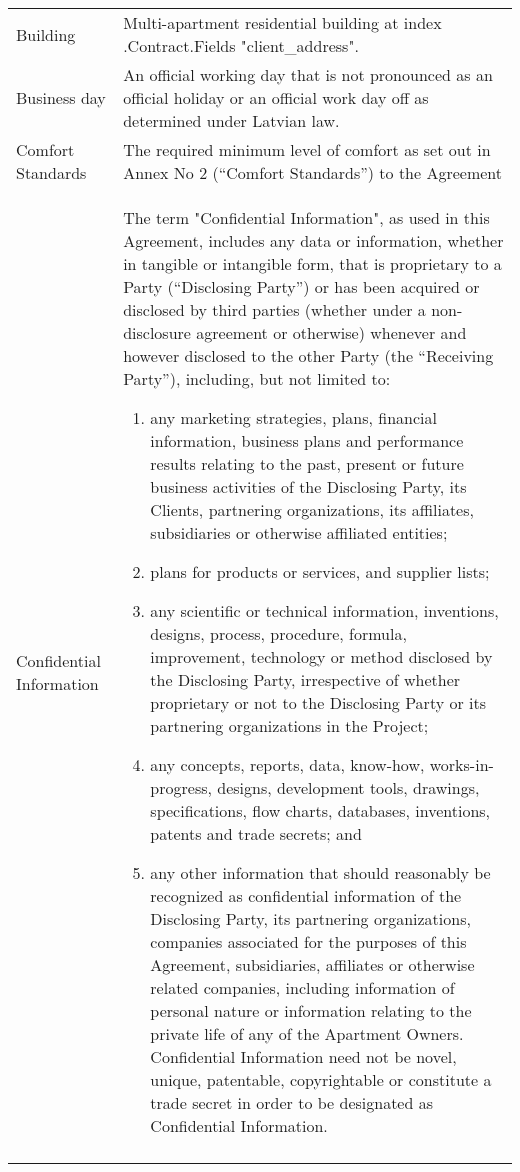 \documentclass[a4paper]{article}
\begin{document}
\begin{longtabu}{|X|X[2]|}
   \hline

   Building & Multi{-}apartment residential building at  {{index .Contract.Fields "client_address"}}. \\\tabucline{}

   \hline

   Business day & An official working day that is not pronounced as an
   official holiday or an official work day off as determined under
   Latvian law. \\\tabucline{}

   \hline

   Comfort Standards & The required minimum level of comfort as set out
   in Annex No 2 (“Comfort Standards”) to the Agreement \\\tabucline{}

   \hline

   Confidential Information & The term "Confidential Information", as
   used in this Agreement, includes any data or information, whether in
   tangible or intangible form, that is proprietary to a Party
   (“Disclosing Party”) or has been acquired or disclosed by third
   parties (whether under a non{-}disclosure agreement or otherwise)
   whenever and however disclosed to the other Party (the “Receiving
   Party”), including, but not limited to:

   \begin{enumerate}
   \item{any marketing strategies, plans, financial information,
       business plans and performance results relating to the past,
       present or future business activities of the Disclosing Party,
       its Clients, partnering organizations, its affiliates,
       subsidiaries or otherwise affiliated entities;}
   \item{plans for products or services, and supplier lists;}
   \item{any scientific or technical information, inventions, designs,
       process, procedure, formula, improvement, technology or method
       disclosed by the Disclosing Party, irrespective of whether
       proprietary or not to the Disclosing Party or its partnering
       organizations in the Project;}
   \item{any concepts, reports, data, know{-}how,
       works{-}in{-}progress, designs, development tools, drawings,
       specifications, flow charts, databases, inventions, patents and
       trade secrets; and}
   \item{any other information that should reasonably be recognized as
       confidential information of the Disclosing Party, its
       partnering organizations, companies associated for the purposes
       of this Agreement, subsidiaries, affiliates or otherwise
       related companies, including information of personal nature or
       information relating to the private life of any of the
       Apartment Owners.  Confidential Information need not be novel,
       unique, patentable, copyrightable or constitute a trade secret
       in order to be designated as Confidential Information.}
   \end{enumerate} \\\tabucline{}


\end{longtabu}
\end{document}
